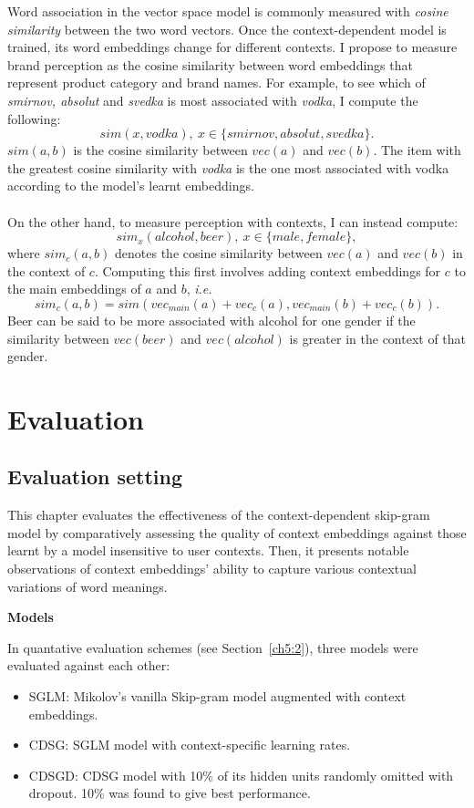 \documentclass[a4paper,12pt,twoside,openright]{report}
\newcommand{\tb}{\vspace{10pt} \textbf}
\newcommand{\ti}{\textit}
\begin{document}
Word association in the vector space model is commonly measured with \ti{cosine similarity} between the two word vectors. Once the context-dependent model is trained, its word embeddings change for different contexts. I propose to measure brand perception as the cosine similarity between word embeddings that represent product category and brand names. For example, to see which of \ti{smirnov, absolut} and \ti{svedka} is most associated with \ti{vodka}, I compute the following:
$$ sim(x,vodka), \: x \in \{smirnov, absolut, svedka\}.$$
$sim(a,b)$ is the cosine similarity between $vec(a)$ and $vec(b)$. The item with the greatest cosine similarity with \ti{vodka} is the one most associated with vodka according to the model's learnt embeddings.
\\ \\
On the other hand, to measure perception with contexts, I can instead compute:
$$ sim_{x}(alcohol,beer), \: x \in \{male, female\},$$
where $sim_{c}(a,b)$ denotes the cosine similarity between $vec(a)$ and $vec(b)$ in the context of $c$. Computing this first involves adding context embeddings for $c$ to the main embeddings of $a$ and $b$, \ti{i.e.}
$$ sim_{c}(a,b) = sim(vec_{main}(a)+vec_c(a),vec_{main}(b)+vec_c(b)).$$
Beer can be said to be more associated with alcohol for one gender if the similarity between $vec(beer)$ and $vec(alcohol)$ is greater in the context of that gender. 


\chapter{Evaluation} 
\label{ch5}

\section{Evaluation setting}

This chapter evaluates the effectiveness of the context-dependent skip-gram model by comparatively assessing the quality of context embeddings against those learnt by a model insensitive to user contexts. Then, it presents notable observations of context embeddings' ability to capture various contextual variations of word meanings.

\tb{Models}

In quantative evaluation schemes (see Section~\ref{ch5:2}), three models were evaluated against each other: 
\begin{itemize}[itemsep=-5pt]
	\item SGLM: Mikolov's vanilla Skip-gram model augmented with context embeddings.
	\item CDSG: SGLM model with context-specific learning rates.
	\item CDSGD: CDSG model with 10\% of its hidden units randomly omitted with dropout. 10\% was found to give best performance.
\end{itemize}
\end{document}
